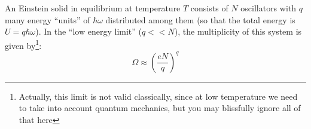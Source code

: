 \question An Einstein solid in equilibrium at temperature $T$ consists of $N$ oscillators with $q$ many energy ``units'' of $\hbar\omega$ distributed among them (so that the total energy is $U=q\hbar\omega$). In the ``low energy limit'' ($q<<N$), the multiplicity of this system is given by\footnote{Actually, this limit is not valid classically, since at low temperature we need to take into account quantum mechanics, but you may blissfully ignore all of that here}:
\begin{equation*}
	\Omega\approx\left(\frac{eN}{q}\right)^q
\end{equation*}


